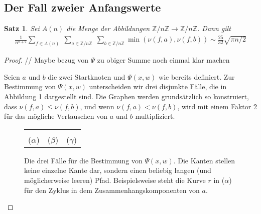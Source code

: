 \documentclass[a4paper, 10pt, ngerman]{article}
\newcommand{\Z}{\mathbb{Z}}
\newtheorem{theorem}{Satz}
\begin{document}
\subsection{Der Fall zweier Anfangswerte}

\begin{theorem}
    Sei $A(n)$ die Menge der Abbildungen $\Z/n\Z \to \Z/n\Z$. Dann gilt
    \begin{align*}
        \frac 1 {n^{n + 2}} \sum_{f \in A(n)} \; \sum_{a \in \Z/n\Z} \; \sum_{b \in \Z/n\Z} \min(\nu(f, a), \nu(f, b)) \sim \frac {25} {32} \sqrt{\pi n / 2}
    \end{align*}
\end{theorem}

\begin{proof}
    // Maybe bezug von $\Psi$ zu obiger Summe noch einmal klar machen


    Seien $a$ und $b$ die zwei Startknoten und $\Psi(x, w)$ wie bereits definiert. Zur Bestimmung von $\Psi(x, w)$ unterscheiden wir drei disjunkte Fälle, die in Abbildung 1 dargestellt sind. Die Graphen werden grundsätzlich so konstruiert, dass $\nu(f, a) \le \nu(f, b)$, und wenn $\nu(f, a) < \nu(f, b)$, wird mit einem Faktor 2 für das mögliche Vertauschen von $a$ und $b$ multipliziert.

    \begin{figure}
        \begin{tabular}{ccc}
             &  &  \\
            ($\alpha$)                           & ($\beta$)                           & ($\gamma$)
        \end{tabular}
        \caption{Die drei Fälle für die Bestimmung von $\Psi(x, w)$. Die Kanten stellen keine einzelne Kante dar, sondern einen beliebig langen (und möglicherweise leeren) Pfad. Beispielsweise steht die Kurve $r$ in ($\alpha$) für den Zyklus in dem Zusammenhangskomponenten von $a$.}
    \end{figure}


\end{proof}
\end{document}
